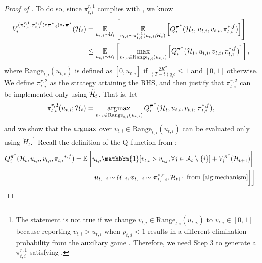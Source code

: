 \begin{proof}[Proof of ]
To do so, since $\pi_{t,i}^{r,1}$ complies with , we know
\begin{align*}
V_i^{(\pi_{t,i}^{r,1},{\pi}_{t,i}^{\ast,f})\circ {\bm \pi}_{-i}^\ast)\diamond_t \bm \pi^\ast}(\mH_t)&=\E_{u_{t,i}\sim \mV_i}\left [\E_{v_{t,i}\sim \pi_{t,i}^{r,1}(u_{t,i};\mH_t)}\left [Q_i^{\bm \pi^\ast}(\mH_t,u_{t,i},v_{t,i},\pi_{t,i}^{\ast,f})\right ]\right ]\\
&\le \E_{u_{t,i}\sim \mV_i}\left [\max_{v_{t,i}\in \text{Range}_{t,i}(u_{t,i})}\left [Q_i^{\bm \pi^\ast}(\mH_t,u_{t,i},v_{t,i},\pi_{t,i}^{\ast,f})\right ]\right ],
\end{align*}
where $\text{Range}_{t,i}(u_{t,i})$ is defined as $[0,u_{t,i}]$ if $\frac{2K^2}{(T-t) q_i c}\leq 1$ and $[0,1]$ otherwise. We define $\pi_{t,i}^{r,2}$ as the strategy attaining the RHS, and then justify that $\pi_{t,i}^{r,2}$ can be implemented only using $\widetilde {\mathcal{H}}_t$. That is, let
\begin{equation*}
\pi_{t,i}^{r,2}(u_{t,i};\mH_t)=\argmax_{v_{t,i}\in \text{Range}_{t,i}(u_{t,i})} Q_i^{{\bm \pi}^\ast}(\mH_t,u_{t,i},v_{t,i},{\pi}_{t,i}^{\ast,f}),
\end{equation*}
and we show that the $\argmax$ over $v_{t,i}\in \text{Range}_{t,i}(u_{t,i})$ can be evaluated only using $\tilde H_t$.\footnote{The statement is not true if we change $v_{t,i}\in \text{Range}_{t,i}(u_{t,i})$ to $v_{t,i}\in [0,1]$ because reporting $v_{t,i}>u_{t,i}$ when $p_{t,i}<1$ results in a different elimination probability from the auxiliary game . Therefore, we need Step 3 to generate a $\pi_{t,i}^{r,1}$ satisfying .}
Recall the definition of the Q-function from :
\begin{align*}
Q_i^{\bm \pi^\ast}(\mH_t,u_{t,i},v_{t,i},{\pi_{t,i}}^{\ast,f})&=\E\bigg [u_{t,i}\mathbbm{1}[v_{t,i}>v_{t,j},\forall j\in \mA_t\setminus\{i\}]+ V_i^{{\bm \pi}^\ast}(\mH_{t+1})\bigg \vert\\
&\quad \qquad \bm u_{t,-i}\sim \mV_{-i}, \bm v_{t,-i}\sim {\bm \pi}_{t,-i}^{\ast,r},\mH_{t+1}\text{ from \Cref{alg:mechanism}}\bigg ]\bigg ].
\end{align*}


\end{proof}
